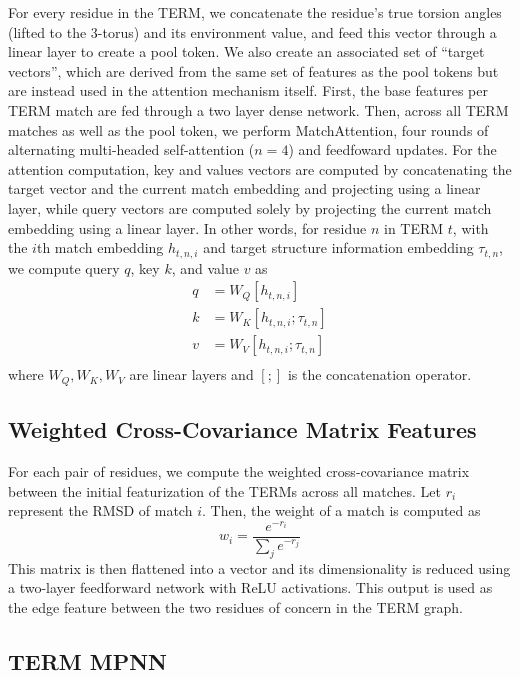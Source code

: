 \documentclass{article}
\begin{document}
For every residue in the TERM, we concatenate the residue's true torsion angles (lifted to the 3-torus) and its environment value, and feed this vector through a linear layer to create a pool token. We also create an associated set of ``target vectors'', which are derived from the same set of features as the pool tokens but are instead used in the attention mechanism itself. First, the base features per TERM match are fed through a two layer dense network. Then, across all TERM matches as well as the pool token, we perform MatchAttention, four rounds of alternating multi-headed self-attention ($n=4$) and feedfoward updates. For the attention computation, key and values vectors are computed by concatenating the target vector and the current match embedding and projecting using a linear layer, while query vectors are computed solely by projecting the current match embedding using a linear layer. In other words, for residue $n$ in TERM $t$, with the $i$th match embedding $h_{t,n,i}$ and target structure information embedding $\tau_{t,n}$, we compute query $q$, key $k$, and value $v$ as
\begin{align*}
    q &= W_Q [h_{t,n,i}]\\
    k &= W_K [h_{t,n,i}; \tau_{t,n}]\\
    v &= W_V [h_{t,n,i}; \tau_{t,n}]\\
\end{align*}
where $W_Q, W_K, W_V$ are linear layers and $[;]$ is the concatenation operator.

\subsection*{Weighted Cross-Covariance Matrix Features}
         
For each pair of residues, we compute the weighted cross-covariance matrix between the initial featurization of the TERMs across all matches. Let $r_i$ represent the RMSD of match $i$. Then, the weight of a match is computed as
$$w_i = \frac{e^{-r_i}}{\sum_{j} e^{-r_j}}$$
This matrix is then flattened into a vector and  its dimensionality is reduced using a two-layer feedforward network with ReLU activations. This output is used as the edge feature between the two residues of concern in the TERM graph.

\subsection*{TERM MPNN}
        
\end{document}
